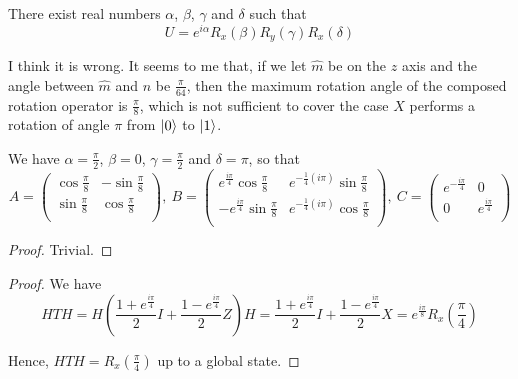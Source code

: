 \documentclass[../main.tex]{subfiles}
\begin{document}
\bigskip
\begin{exercise}
\end{exercise}
There exist real numbers $\alpha$, $\beta$, $\gamma$ and $\delta$ such that
\begin{equation*}
    U=e^{i\alpha}R_x(\beta)R_y(\gamma)R_x(\delta)
\end{equation*}

\bigskip
\begin{exercise}
\end{exercise}
I think it is wrong. It seems to me that, if we let $\hat{m}$ be on the $z$ axis and the angle between $\hat{m}$ and $\hat{n}$ be $\frac{\pi}{64}$, then the maximum rotation angle of the composed rotation operator is $\frac{\pi}{8}$, which is not sufficient to cover the case $X$ performs a rotation of angle $\pi$ from $\ket{0}$ to $\ket{1}$.

\bigskip
\begin{exercise}
\end{exercise}
We have $\alpha=\frac{\pi}{2}$, $\beta=0$, $\gamma=\frac{\pi}{2}$ and $\delta=\pi$, so that
\begin{equation*}
    A=
\begin{pmatrix}
 \cos\frac{\pi}{8} & -\sin\frac{\pi}{8} \\
 \sin\frac{\pi}{8} & \cos\frac{\pi}{8} \\
\end{pmatrix},\ 
    B=
\begin{pmatrix}
 e^{\frac{i \pi }{4}} \cos\frac{\pi}{8} & e^{-\frac{1}{4} (i \pi )} \sin\frac{\pi}{8} \\
 -e^{\frac{i \pi }{4}} \sin\frac{\pi}{8} & e^{-\frac{1}{4} (i \pi )} \cos\frac{\pi}{8} \\
\end{pmatrix},\ 
    C=
\begin{pmatrix}
 e^{-\frac{i \pi }{4}} & 0 \\
 0 & e^{\frac{i \pi }{4}} \\
\end{pmatrix}
\end{equation*}

\bigskip
\begin{exercise}
\end{exercise}
\begin{proof}
Trivial.
\end{proof}

\bigskip
\begin{exercise}
\end{exercise}
\begin{proof}
We have
\begin{equation*}
    H T H=H(\frac{1+e^{\frac{i\pi}{4}}}{2}I+\frac{1-e^{\frac{i\pi}{4}}}{2}Z)H=\frac{1+e^{\frac{i\pi}{4}}}{2}I+\frac{1-e^{\frac{i\pi}{4}}}{2}X=e^{\frac{i\pi}{8}}R_x(\frac{\pi}{4})
\end{equation*}

Hence, $H T H=R_x(\frac{\pi}{4})$ up to a global state.
\end{proof}
\end{document}

